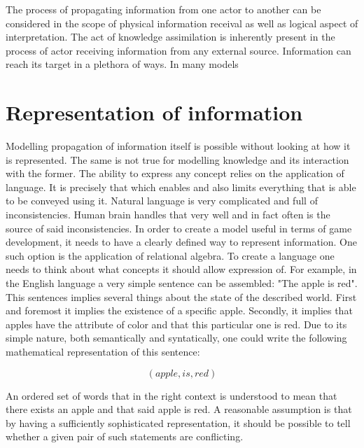The process of propagating information from one actor to another can be considered in the scope of physical information receival as well as logical aspect of interpretation.
The act of knowledge assimilation is inherently present in the process of actor receiving information from any external source.
Information can reach its target in a plethora of ways.
In many models


\section{Representation of information}

Modelling propagation of information itself is possible without looking at how it is represented.
The same is not true for modelling knowledge and its interaction with the former.
The ability to express any concept relies on the application of language.
It is precisely that which enables and also limits everything that is able to be conveyed using it.
Natural language is very complicated and full of inconsistencies.
Human brain handles that very well and in fact often is the source of said inconsistencies.
In order to create a model useful in terms of game development, it needs to have a clearly defined way to represent information.
One such option is the application of relational algebra.
To create a language one needs to think about what concepts it should allow expression of.
For example, in the English language a very simple sentence can be assembled: "The apple is red".
This sentences implies several things about the state of the described world.
First and foremost it implies the existence of a specific apple.
Secondly, it implies that apples have the attribute of color and that this particular one is red.
Due to its simple nature, both semantically and syntatically, one could write the following mathematical representation of this sentence:

$$
    \left( apple, is, red \right)
$$

An ordered set of words that in the right context is understood to mean that there exists an apple and that said apple is red.
A reasonable assumption is that by having a sufficiently sophisticated representation, it should be possible to tell whether a given pair of such statements are conflicting.

